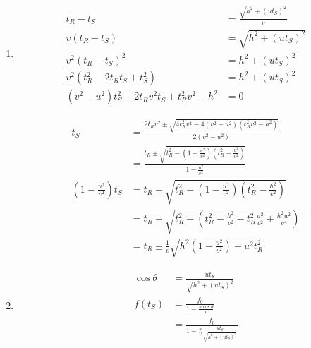 \documentclass{article}
\begin{document}
\begin{enumerate}
  \item

        \begin{align*}
          t_R - t_S                                           & = \frac{\sqrt{h^2 + (u t_S)^2}}{v} \\
          v (t_R - t_S)                                       & = \sqrt{h^2 + (u t_S)^2}           \\
          v^2 (t_R - t_S)^2                                   & = h^2 + (u t_S)^2                  \\
          v^2 (t_R^2 - 2 t_R t_S + t_S^2)                     & = h^2 + (u t_S)^2                  \\
          (v^2 - u^2) t_S^2 - 2 t_R v^2 t_S + t_R^2 v^2 - h^2 & = 0
        \end{align*}

        \begin{align*}
          t_S                                    & = \frac{2 t_R v^2 \pm \sqrt{4 t_R^2 v^4 - 4 (v^2 - u^2) (t_R^2 v^2 - h^2)}}{2 (v^2 - u^2)}                                     \\
                                                 & = \frac{t_R \pm \sqrt{t_R^2 - \left( 1 - \frac{u^2}{v^2} \right) \left( t_R^2 - \frac{h^2}{v^2} \right)}}{1 - \frac{u^2}{v^2}} \\
          \left( 1 - \frac{u^2}{v^2} \right) t_S & = t_R \pm \sqrt{t_R^2 - \left( 1 - \frac{u^2}{v^2} \right) \left( t_R^2 - \frac{h^2}{v^2} \right)}                             \\
                                                 & = t_R \pm \sqrt{t_R^2 - \left( t_R^2 - \frac{h^2}{v^2} - t_R^2 \frac{u^2}{v^2} + \frac{h^2 u^2}{v^4} \right)}                  \\
                                                 & = t_R \pm \frac{1}{v} \sqrt{h^2 \left( 1 - \frac{u^2}{v^2} \right) + u^2 t_R^2}
        \end{align*}

  \item

        \begin{align*}
          \cos \theta & = \frac{u t_S}{\sqrt{h^2 + (u t_S)^2}}                             \\
          f(t_S)      & = \frac{f_0}{1 - \frac{u \cos \theta}{v}}                          \\
                      & = \frac{f_0}{1 - \frac{u}{v} \frac{u t_S}{\sqrt{h^2 + (u t_S)^2}}}
        \end{align*}


\end{enumerate}
\end{document}
